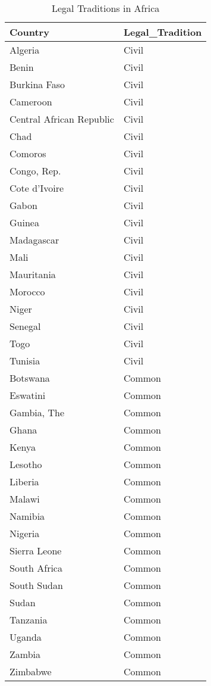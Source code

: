 \documentclass[a4paper,nobind]{templates/ociamthesis}
\begin{document}
\begin{table}

\caption{\label{tab:unnamed-chunk-41}Legal Traditions in Africa}
\centering
\fontsize{7}{9}\selectfont
\begin{tabular}[t]{ll}
\toprule
Country & Legal\_Tradition\\
\midrule
Algeria & Civil\\
Benin & Civil\\
Burkina Faso & Civil\\
Cameroon & Civil\\
Central African Republic & Civil\\
\addlinespace
Chad & Civil\\
Comoros & Civil\\
Congo, Rep. & Civil\\
Cote d'Ivoire & Civil\\
Gabon & Civil\\
\addlinespace
Guinea & Civil\\
Madagascar & Civil\\
Mali & Civil\\
Mauritania & Civil\\
Morocco & Civil\\
\addlinespace
Niger & Civil\\
Senegal & Civil\\
Togo & Civil\\
Tunisia & Civil\\
Botswana & Common\\
\addlinespace
Eswatini & Common\\
Gambia, The & Common\\
Ghana & Common\\
Kenya & Common\\
Lesotho & Common\\
\addlinespace
Liberia & Common\\
Malawi & Common\\
Namibia & Common\\
Nigeria & Common\\
Sierra Leone & Common\\
\addlinespace
South Africa & Common\\
South Sudan & Common\\
Sudan & Common\\
Tanzania & Common\\
Uganda & Common\\
\addlinespace
Zambia & Common\\
Zimbabwe & Common\\

\end{tabular}
\end{table}
\end{document}
